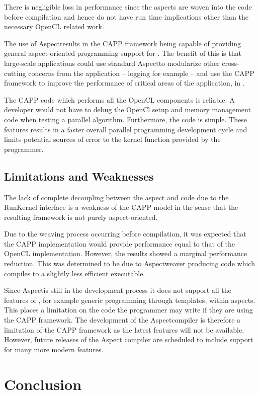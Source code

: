 \documentclass{sig-alternate-05-2015}
\begin{document}
There is negligible loss in performance since the aspects are woven into the
\CPP code before compilation and hence do not have run time implications other
than the necessary OpenCL related work.

The use of Aspect\CPP results in the  CAPP framework being capable of
providing general aspect-oriented programming support for \CPP. The benefit of this is that
large-scale applications could use standard Aspect\CPP to modularize other
cross-cutting concerns from the \CPP application -- logging for example -- and use the
 CAPP framework to improve the performance of critical areas of the
application, in \CPP.

The CAPP code which performs all the OpenCL components is reliable.
A developer would not have to debug the OpenCl setup and memory management code
when testing a parallel algorithm. Furthermore, the \CPP code is simple. These
features results in a faster overall parallel programming development cycle and
limits potential sources of error to the kernel function provided by the
programmer.

\subsection{Limitations and Weaknesses}

The lack of complete decoupling between the aspect and \CPP code due to the RunKernel interface is a weakness
of the CAPP model in the sense that the resulting framework is not purely aspect-oriented.

Due to the weaving process occurring before compilation, it was expected that
the CAPP implementation would provide performance equal to that of the
OpenCL implementation. However, the results showed a marginal performance
reduction. This was determined to be due to Aspect\CPP weaver producing code
which compiles to a slightly less efficient executable. 

Since Aspect\CPP is still in the development process it does not support all 
the features of \CPP, for example generic programming through templates, within
aspects. 
This places a limitation on the \CPP code  the programmer may write if they 
are using the  CAPP framework. The development of the Aspect\CPP compiler 
is therefore a limitation of the  CAPP framework as the latest \CPP 
features will not be available. However, future releases of the Aspect\CPP
compiler are scheduled to include support for many more modern \CPP features.

\section{Conclusion}\label{sec:conclusion}
\end{document}
